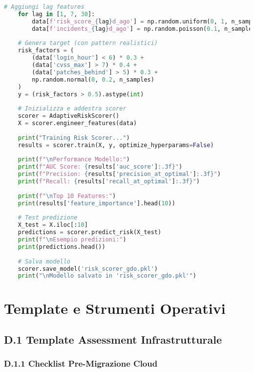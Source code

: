 \begin{lstlisting}[language=Python, caption=Implementazione Risk Scoring adattivo con XGBoost]
    # Aggiungi lag features
    for lag in [1, 7, 30]:
        data[f'risk_score_{lag}d_ago'] = np.random.uniform(0, 1, n_samples)
        data[f'incidents_{lag}d_ago'] = np.random.poisson(0.1, n_samples)
    
    # Genera target (con pattern realistici)
    risk_factors = (
        (data['login_hour'] < 6) * 0.3 +
        (data['cvss_max'] > 7) * 0.4 +
        (data['patches_behind'] > 5) * 0.3 +
        np.random.normal(0, 0.2, n_samples)
    )
    y = (risk_factors > 0.5).astype(int)
    
    # Inizializza e addestra scorer
    scorer = AdaptiveRiskScorer()
    X = scorer.engineer_features(data)
    
    print("Training Risk Scorer...")
    results = scorer.train(X, y, optimize_hyperparams=False)
    
    print(f"\nPerformance Modello:")
    print(f"AUC Score: {results['auc_score']:.3f}")
    print(f"Precision: {results['precision_at_optimal']:.3f}")
    print(f"Recall: {results['recall_at_optimal']:.3f}")
    
    print(f"\nTop 10 Features:")
    print(results['feature_importance'].head(10))
    
    # Test predizione
    X_test = X.iloc[:10]
    predictions = scorer.predict_risk(X_test)
    print(f"\nEsempio predizioni:")
    print(predictions.head())
    
    # Salva modello
    scorer.save_model('risk_scorer_gdo.pkl')
    print("\nModello salvato in 'risk_scorer_gdo.pkl'")
\end{lstlisting}

\chapter{Template e Strumenti Operativi}
\label{app:template}

\section{D.1 Template Assessment Infrastrutturale}

\subsection{D.1.1 Checklist Pre-Migrazione Cloud}

